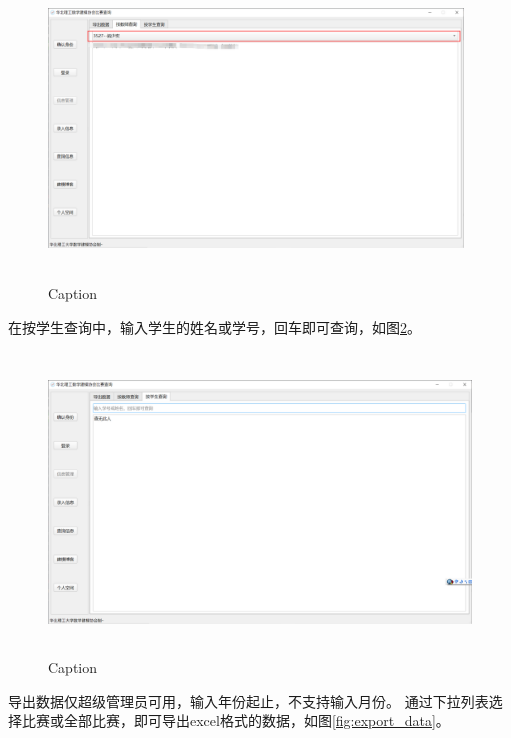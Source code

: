 \documentclass[cn,11pt,chinese, hazy]{elegantbook}
\begin{document}
\begin{figure}[h]
    \centering
    \includegraphics[width=11cm, height=8cm]{figure/7.png}
    \caption{Caption}
    \label{fig:query_teacher}
\end{figure}

\newpage

在按学生查询中，输入学生的姓名或学号，回车即可查询，如图\ref{fig:query_student}。

\begin{figure}[h]
    \centering
    \includegraphics[width=12cm, height=8cm]{figure/8.png}
    \caption{Caption}
    \label{fig:query_student}
\end{figure}

导出数据仅超级管理员可用，输入年份起止，不支持输入月份。
通过下拉列表选择比赛或全部比赛，即可导出excel格式的数据，如图\ref{fig:export_data}。
\end{document}
